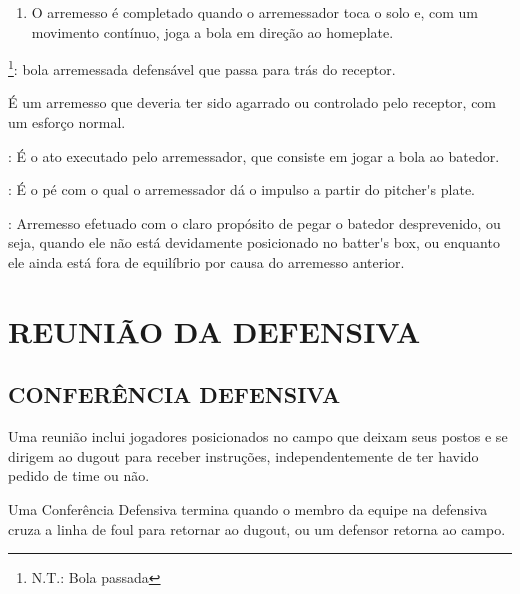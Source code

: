 \begin{description}
\begin{enumerate}[label=\alph*)]
		\item  O arremesso \'e completado quando o arremessador toca o solo e, com um 
		movimento cont\'inuo, joga a bola em dire\c{c}\~ao ao \gls{homeplate}. 
	\end{enumerate} 	
	\item[\Gls{passedball}]\footnote{N.T.: Bola passada}: bola arremessada defens\'avel que passa para tr\'as do receptor. 
	
	\'E um arremesso que deveria ter sido agarrado ou controlado pelo receptor, com um esfor\c{c}o normal. 
	
	\item[Arremesso]: \'E o ato executado pelo arremessador, que consiste em jogar a bola ao batedor. 
	
	\item[P\'e de apoio]: \'E o p\'e com o qual o arremessador d\'a o impulso a partir do \gls{pitcher's plate}.
	
	\item[Arremesso de retorno r\'apido]: Arremesso efetuado com o claro prop\'osito de pegar o batedor desprevenido, ou seja, quando ele n\~ao est\'a devidamente posicionado no \gls{batter's box}, ou enquanto ele ainda est\'a fora de equil\'ibrio por causa do arremesso anterior. 

	\end{description}
	
	
	


	
	
	\section{REUNIÃO DA DEFENSIVA} 
	\subsection{CONFERÊNCIA DEFENSIVA }
	Uma reuni\~ao inclui jogadores posicionados no campo que deixam seus postos e se dirigem ao \Gls{dugout} para receber instru\c{c}\~oes, independentemente de ter havido pedido de \gls{time} ou n\~ao. 
	
	Uma Confer\^encia Defensiva  termina quando o membro da equipe na defensiva 
	cruza a linha de \gls{foul} para retornar ao \Gls{dugout}, ou um defensor retorna ao campo.
	
